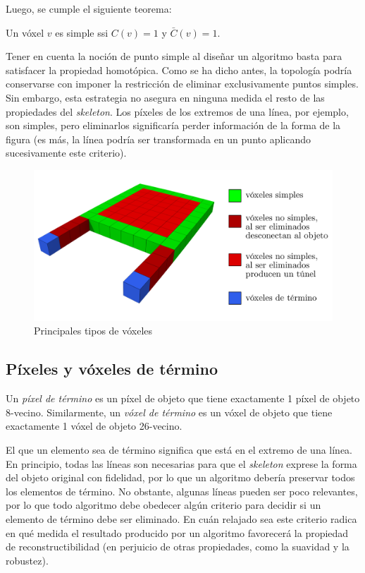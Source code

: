 Luego, se cumple el siguiente teorema:
\begin{theorem}
Un vóxel $v$ es simple ssi $C(v) = 1$ y $\bar{C}(v) = 1$.
\end{theorem}

Tener en cuenta la noción de punto simple al diseñar un algoritmo basta para satisfacer la propiedad homotópica. Como se ha dicho antes, la topología podría conservarse con imponer la restricción de eliminar exclusivamente puntos simples. Sin embargo, esta estrategia no asegura en ninguna medida el resto de las propiedades del \textit{skeleton}. Los píxeles de los extremos de una línea, por ejemplo, son simples, pero eliminarlos significaría perder información de la forma de la figura (es más, la línea podría ser transformada en un punto aplicando sucesivamente este criterio).

\begin{figure}[ht]\centering
\includegraphics[width=0.7\linewidth]{images/voxel_types}
\caption{Principales tipos de vóxeles}
\label{fig:voxeltypes}
\end{figure}

\subsection{Píxeles y vóxeles de término}

Un \textit{píxel de término} es un píxel de objeto que tiene exactamente 1 píxel de objeto 8-vecino. Similarmente, un \textit{vóxel de término} es un vóxel de objeto que tiene exactamente 1 vóxel de objeto 26-vecino.

El que un elemento sea de término significa que está en el extremo de una línea. En principio, todas las líneas son necesarias para que el \textit{skeleton} exprese la forma del objeto original con fidelidad, por lo que un algoritmo debería preservar todos los elementos de término. No obstante, algunas líneas pueden ser poco relevantes, por lo que todo algoritmo debe obedecer algún criterio para decidir si un elemento de término debe ser eliminado. En cuán relajado sea este criterio radica en qué medida el resultado producido por un algoritmo favorecerá la propiedad de reconstructibilidad (en perjuicio de otras propiedades, como la suavidad y la robustez).

